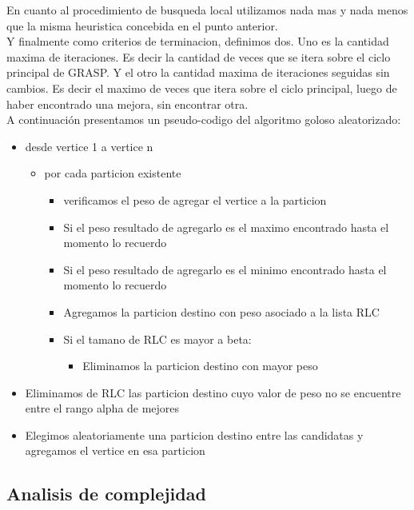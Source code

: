 En cuanto al procedimiento de busqueda local utilizamos nada mas y nada menos que la misma heuristica concebida en el punto anterior.\\

Y finalmente como criterios de terminacion, definimos dos. Uno es la cantidad maxima de iteraciones. Es decir la cantidad de veces que se itera sobre el ciclo principal de GRASP. Y el otro la cantidad maxima de iteraciones seguidas sin cambios. Es decir el maximo de veces que itera sobre el ciclo principal, luego de haber encontrado una mejora, sin encontrar otra.\\

A continuación presentamos un pseudo-codigo del algoritmo goloso aleatorizado:\\
\begin{itemize}
\item desde vertice 1 a vertice n
    \begin{itemize}
    \item por cada particion existente
        \begin{itemize}
        \item verificamos el peso de agregar el vertice a la particion
        \item Si el peso resultado de agregarlo es el maximo encontrado hasta el momento lo recuerdo
        \item Si el peso resultado de agregarlo es el minimo encontrado hasta el momento lo recuerdo
        \item Agregamos la particion destino con peso asociado a la lista RLC
        \item Si el tamano de RLC es mayor a beta:
            \begin{itemize}
            \item Eliminamos la particion destino con mayor peso
            \end{itemize}
        \end{itemize}
    \end{itemize}
    \item Eliminamos de RLC las particion destino cuyo valor de peso no se encuentre entre el rango alpha de mejores
    \item Elegimos aleatoriamente una particion destino entre las candidatas y agregamos el vertice en esa particion 
\end{itemize}


\subsection{Analisis de complejidad}

